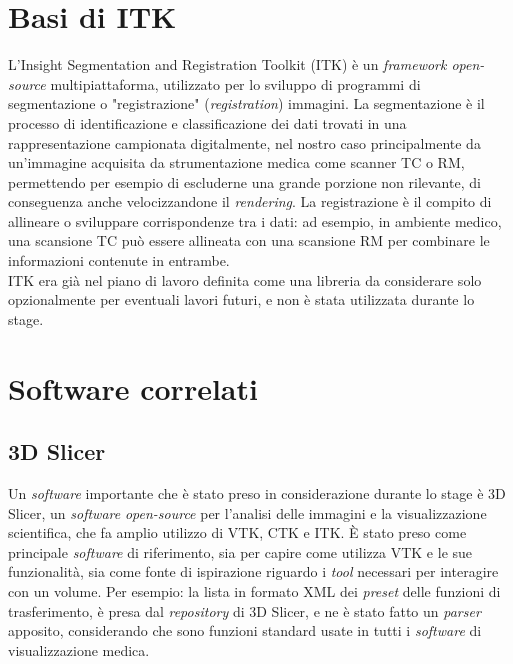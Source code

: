 \section{Basi di ITK}

L'Insight Segmentation and Registration Toolkit (ITK) è un \emph{framework open-source} multipiattaforma, utilizzato per lo sviluppo di programmi di segmentazione o "registrazione" (\emph{registration}) immagini. La segmentazione è il processo di identificazione e classificazione dei dati trovati in una rappresentazione campionata digitalmente, nel nostro caso principalmente da un'immagine acquisita da strumentazione medica come scanner TC o RM, permettendo per esempio di escluderne una grande porzione non rilevante, di conseguenza anche velocizzandone il \emph{rendering}. La registrazione è il compito di allineare o sviluppare corrispondenze tra i dati: ad esempio, in ambiente medico, una scansione TC può essere allineata con una scansione RM per combinare le informazioni contenute in entrambe.
\\
ITK era già nel piano di lavoro definita come una libreria da considerare solo opzionalmente per eventuali lavori futuri, e non è stata utilizzata durante lo stage.

\section{Software correlati}
\subsection{3D Slicer}
Un \emph{software} importante che è stato preso in considerazione durante lo stage è 3D Slicer, un \emph{software} \emph{open-source} per l'analisi delle immagini e la visualizzazione scientifica, che fa amplio utilizzo di VTK, CTK e ITK. \`E stato preso come principale \emph{software} di riferimento, sia per capire come utilizza VTK e le sue funzionalità, sia come fonte di ispirazione riguardo i \emph{tool} necessari per interagire con un volume. Per esempio: la lista in formato XML dei \emph{preset} delle funzioni di trasferimento, è presa dal \emph{repository} di 3D Slicer, e ne è stato fatto un \emph{parser} apposito, considerando che sono funzioni standard usate in tutti i \emph{software} di visualizzazione medica.

